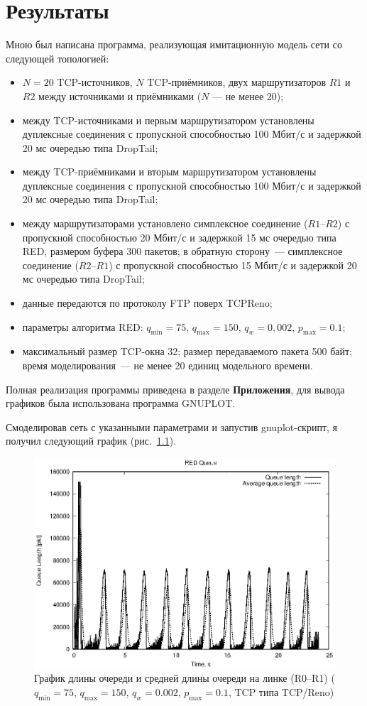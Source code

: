 \chapter{Результаты}

Мною был написана программа, реализующая имитационную модель сети со следующей топологией:
\begin{itemize}
\item $N=20$ TCP-источников, $N$ TCP-приёмников, двух маршрутизаторов $R1$
  и $R2$ между источниками и приёмниками ($N$ — не менее 20);
\item между TCP-источниками и первым маршрутизатором установлены
  дуплексные соединения с пропускной способностью 100 Мбит/с и
  задержкой 20 мс очередью типа DropTail;
\item между TCP-приёмниками и вторым маршрутизатором установлены
  дуплексные соединения с пропускной способностью 100 Мбит/с и
  задержкой 20 мс очередью типа DropTail;
\item между маршрутизаторами установлено симплексное соединение
  ($R1$--$R2$) с пропускной способностью 20 Мбит/с и задержкой 15 мс
  очередью типа RED, размером буфера 300 пакетов; в обратную сторону~---
  симплексное соединение ($R2$--$R1$) с пропускной способностью 15 Мбит/с и
  задержкой 20 мс очередью типа DropTail;
\item данные передаются по протоколу FTP поверх TCPReno;
\item параметры алгоритма RED: $q_{\min}=75$, $q_{\max}=150$, $q_w=0,002$, $p_{\max}=0.1$;
\item максимальный размер TCP-окна 32; размер передаваемого пакета 500
  байт; время моделирования~--- не менее 20 единиц модельного времени.
\end{itemize}

Полная реализация программы приведена в разделе \textbf{Приложения},
для вывода графиков была использована программа GNUPLOT.

Смоделировав сеть с указанными параметрами и запустив gnuplot-скрипт,
я получил следующий график (рис.~\ref{fig:3.1}).

\begin{figure}[!h]
  \centering
  \includegraphics[width=0.6\linewidth]{image/queues_75-150_classic.eps}
  \caption{График длины очереди и средней длины очереди на
    линке (R0--R1) ($q_{\min}=75$, $q_{\max}=150$, $q_w=0.002$, $p_{\max}=0.1$,
    TCP типа TCP/Reno)}
  \label{fig:3.1}
\end{figure}

